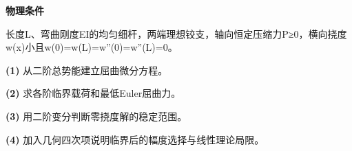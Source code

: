 \textbf{物理条件}\par 长度L、弯曲刚度EI的均匀细杆，两端理想铰支，轴向恒定压缩力P≥0，横向挠度w(x)小且w(0)=w(L)=w''(0)=w''(L)=0。
\par\noindent\textbf{(1)} 从二阶总势能建立屈曲微分方程。
\par\noindent\textbf{(2)} 求各阶临界载荷和最低Euler屈曲力。
\par\noindent\textbf{(3)} 用二阶变分判断零挠度解的稳定范围。
\par\noindent\textbf{(4)} 加入几何四次项说明临界后的幅度选择与线性理论局限。
